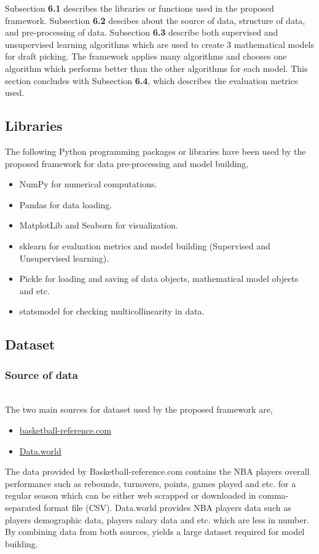 \documentclass[format=sigconf]{acmart}
\begin{document}
Subsection \textbf{6.1} describes the libraries or functions used in the proposed framework. Subsection \textbf{6.2} descibes about the 
source of data, structure of data, and pre-processing of data. Subsection \textbf{6.3} describe both supervised and unsupervised 
learning algorithms which are used to create 3 mathematical models for draft picking. The framework applies many algorithms and 
chooses one algorithm which performs better than the other algorithms for each model. This section concludes 
with Subsection \textbf{6.4}, which describes the evaluation metrics used.

\subsection{Libraries}
The following Python programming packages or libraries have been used by the proposed framework for data pre-processing and model building,
\begin{itemize}
    \item NumPy for numerical computations.
    \item Pandas for data loading.
    \item MatplotLib and Seaborn for visualization.
    \item sklearn for evaluation metrics and model building (Supervised and Unsupervised learning).
    \item Pickle for loading and saving of data objects, mathematical model objects and etc.
    \item statsmodel for checking  multicollinearity in data.
\end{itemize}
\subsection{Dataset}
\subsubsection{Source of data}
\hfill\\
The two main sources for dataset used by the proposed framework are,
\begin{itemize}
    \item \href{https://www.basketball-reference.com/}{basketball-reference.com}
    \item \href{https://data.world/}{Data.world}
\end{itemize}
\par
The data provided by Basketball-reference.com contains the NBA players overall performance such as rebounds, turnovers, points, games 
played and etc. for a regular season which can be either web scrapped or downloaded in comma-separated format file (CSV). Data.world
provides NBA players data such as players demographic data, players salary data and etc. which are less in number. By combining data
from both sources, yields a large dataset required for model building.
\end{document}
